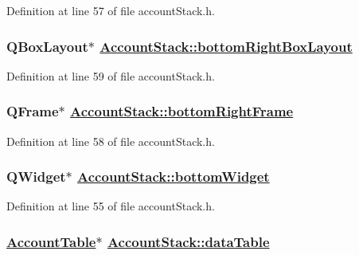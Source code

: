 Definition at line 57 of file account\-Stack.h.\hypertarget{classAccountStack_r13}{
\subsubsection[bottomRightBoxLayout]{\setlength{\rightskip}{0pt plus 5cm}QBox\-Layout$\ast$ \hyperlink{classAccountStack_r13}{Account\-Stack::bottom\-Right\-Box\-Layout}}}
\label{classAccountStack_r13}


Definition at line 59 of file account\-Stack.h.\hypertarget{classAccountStack_r12}{
\subsubsection[bottomRightFrame]{\setlength{\rightskip}{0pt plus 5cm}QFrame$\ast$ \hyperlink{classAccountStack_r12}{Account\-Stack::bottom\-Right\-Frame}}}
\label{classAccountStack_r12}


Definition at line 58 of file account\-Stack.h.\hypertarget{classAccountStack_r9}{
\subsubsection[bottomWidget]{\setlength{\rightskip}{0pt plus 5cm}QWidget$\ast$ \hyperlink{classAccountStack_r9}{Account\-Stack::bottom\-Widget}}}
\label{classAccountStack_r9}


Definition at line 55 of file account\-Stack.h.\hypertarget{classAccountStack_r8}{
\subsubsection[dataTable]{\setlength{\rightskip}{0pt plus 5cm}\hyperlink{classAccountTable}{Account\-Table}$\ast$ \hyperlink{classAccountStack_r8}{Account\-Stack::data\-Table}}}
\label{classAccountStack_r8}


